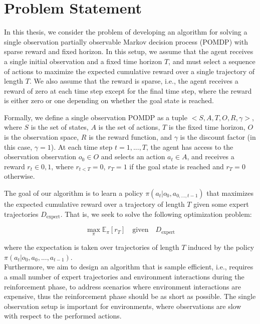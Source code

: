 \chapter{Problem Statement}
\label{chapter:Problem}
In this thesis, we consider the problem of developing an algorithm for solving a single observation partially observable Markov decision process (POMDP) with sparse reward and fixed horizon. In this setup, we assume that the agent receives a single initial observation and a fixed time horizon $T$, and must select a sequence of actions to maximize the expected cumulative reward over a single trajectory of length $T$. We also assume that the reward is sparse, i.e., the agent receives a reward of zero at each time step except for the final time step, where the reward is either zero or one depending on whether the goal state is reached.

Formally, we define a single observation POMDP as a tuple $<S,A,T,O,R,\gamma>$, where $S$ is the set of states, $A$ is the set of actions, $T$ is the fixed 
time horizon, $O$ is the observation space, $R$ is the reward function, and $\gamma$ is the discount factor (in this case, $\gamma=1$). 
At each time step $t=1,...,T$, the agent has access to the observation observation $o_0\in O$ and selects an action $a_t\in A$, and receives a 
reward $r_t\in {0,1}$, where $r_{t<T} = 0$, $r_T=1$ if the goal state is reached and $r_T=0$ otherwise.

The goal of our algorithm is to learn a policy $\pi(a_t|o_0, a_{0,...,t-1})$ that maximizes the expected cumulative reward over a trajectory of length $T$ given 
some expert trajectories $D_{\text{expert}}$. 
That is, we seek to solve the following optimization problem:

\begin{equation}
\max_{\pi} \mathbb{E}_{\pi}[r_T]\quad \text{given}\quad D_{\text{expert}}
\end{equation}

where the expectation is taken over trajectories of length $T$ induced by the policy\\ $\pi(a_t|o_0, a_0, ..., a_{t-1})$.\\

Furthermore, we aim to design an algorithm that is sample efficient, i.e., requires a small number of expert trajectories and environment interactions 
during the reinforcement phase, to address scenarios where environment interactions are expensive, thus the reinforcement phase should be as short as possible. 
The single observation setup is important for environments, where observations are slow with respect to the performed actions. \\

